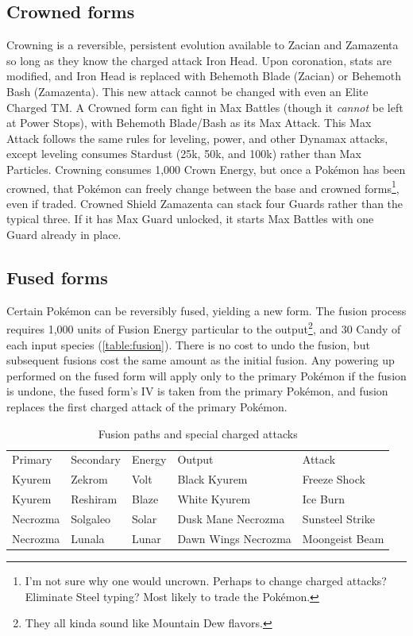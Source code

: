 

\subsection{Crowned forms\label{sec:crowned}}
\nopagecolor
Crowning is a reversible, persistent evolution available to Zacian and Zamazenta
 so long as they know the charged attack Iron Head.
Upon coronation, stats are modified, and Iron Head is replaced with Behemoth Blade (Zacian)
  or Behemoth Bash (Zamazenta).
This new attack cannot be changed with even an Elite Charged TM\@.
A Crowned form can fight in Max Battles (though it \textit{cannot} be left at Power Stops), with Behemoth Blade/Bash as its Max Attack.
This Max Attack follows the same rules for leveling, power, and other Dynamax attacks,
 except leveling consumes Stardust (25k, 50k, and 100k) rather than Max Particles.
Crowning consumes 1,000 Crown Energy, but once a Pokémon has been crowned,
  that Pokémon can freely change between the base and crowned
  forms\footnote{I'm not sure why one would uncrown. Perhaps to change charged attacks?
    Eliminate Steel typing? Most likely to trade the Pokémon.}, even if traded.
Crowned Shield Zamazenta can stack four Guards rather than the typical three.
If it has Max Guard unlocked, it starts Max Battles with one Guard already in place.

\subsection{Fused forms\label{sec:fusion}}
Certain Pokémon can be reversibly fused, yielding a new form.
The fusion process requires 1,000 units of Fusion Energy particular to the output\footnote{They all kinda sound like Mountain Dew flavors.},
 and 30 Candy of each input species (\autoref{table:fusion}).
There is no cost to undo the fusion, but subsequent fusions cost the same amount as the initial fusion.
Any powering up performed on the fused form will apply only to the primary
  Pokémon if the fusion is undone, the fused form's IV is taken from the primary Pokémon,
  and fusion replaces the first charged attack of the primary Pokémon.

\begin{table}[ht]
\centering
\footnotesize
\begin{tabular}{lllll}
Primary & Secondary & Energy & Output & Attack\\
\Midrule
Kyurem & Zekrom & Volt & Black Kyurem & Freeze Shock\\
Kyurem & Reshiram & Blaze & White Kyurem & Ice Burn\\
Necrozma & Solgaleo & Solar & Dusk Mane Necrozma & Sunsteel Strike\\
Necrozma & Lunala & Lunar & Dawn Wings Necrozma & Moongeist Beam\\
\end{tabular}
\caption{Fusion paths and special charged attacks\label{table:fusion}}
\end{table}

